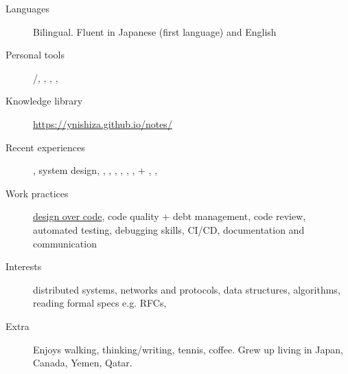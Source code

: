 \begin{description}
  \liststyle
  \item[Languages]{Bilingual. Fluent in Japanese (first language) and English}
  \item[Personal tools]{\rfneovim /\rfvim, \rfbash, \rfgit, \rftmux, \rffirefox }
  \item[Knowledge library]{\href{https://ynishiza.github.io/notes/}{https://ynishiza.github.io/notes/}}
  \item[Recent experiences]{\rfnodejs, system design, \rfmongodb, \rfredis, \rfneofj, \rfdocker, \rfreact, \rfcypress, \rfgit + \rfgithub, \rfaws, \rfjenkins }
  \item[Work practices]{\href{https://ynishiza.github.io/codingprinciples}{design over code}, code quality + debt management, code review, automated testing, debugging skills, CI/CD, documentation and communication }
  \item[Interests]{distributed systems, networks and protocols, data structures, algorithms, reading formal specs e.g. RFCs, \rfhaskell }
  \item[Extra]{Enjoys walking, thinking/writing, tennis, coffee. Grew up living in Japan, Canada, Yemen, Qatar.}
\end{description}
